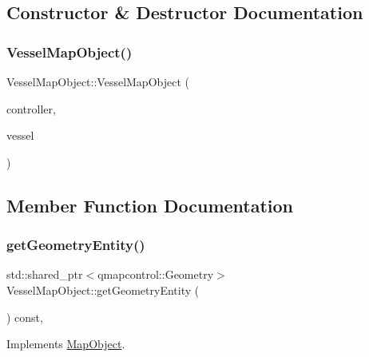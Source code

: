 \subsection{Constructor \& Destructor Documentation}
\mbox{\label{class_vessel_map_object_a072c9cbe34ac79c037995511d18fcc3d}} 
\subsubsection{\texorpdfstring{VesselMapObject()}{VesselMapObject()}}
{\footnotesize\ttfamily Vessel\+Map\+Object\+::\+Vessel\+Map\+Object (\begin{DoxyParamCaption}\item[{\mbox{\hyperlink{class_map_objects_controller}{Map\+Objects\+Controller}} $\ast$}]{controller,  }\item[{\mbox{\hyperlink{class_vessel_data}{Vessel\+Data}} $\ast$}]{vessel }\end{DoxyParamCaption})}



\subsection{Member Function Documentation}
\mbox{\label{class_vessel_map_object_a7f982641edc34a85fd3fbfc81c7c9a68}} 
\subsubsection{\texorpdfstring{getGeometryEntity()}{getGeometryEntity()}}
{\footnotesize\ttfamily std\+::shared\+\_\+ptr$<$qmapcontrol\+::\+Geometry$>$ Vessel\+Map\+Object\+::get\+Geometry\+Entity (\begin{DoxyParamCaption}{ }\end{DoxyParamCaption}) const\hspace{0.3cm}{\ttfamily [inline]}, {\ttfamily [virtual]}}



Implements \mbox{\hyperlink{class_map_object_a82e055e41c862ec8d80d5bfb137b3253}{Map\+Object}}.


